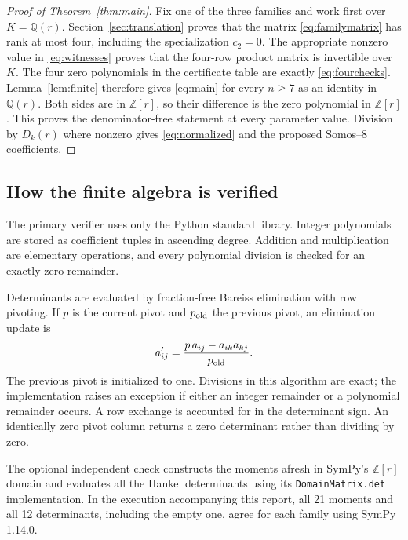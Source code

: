 \documentclass[11pt,letterpaper]{article}
\numberwithin{equation}{section}
\theoremstyle{definition}
\newcommand{\Z}{\mathbb Z}
\newcommand{\Q}{\mathbb Q}
\begin{document}
\begin{proof}[Proof of Theorem~\ref{thm:main}]
Fix one of the three families and work first over \(K=\Q(r)\).
Section~\ref{sec:translation} proves that the matrix \eqref{eq:familymatrix}
has rank at most four, including the specialization \(c_2=0\).
The appropriate nonzero value in \eqref{eq:witnesses} proves that the
four-row product matrix is invertible over \(K\). The four zero
polynomials in the certificate table are exactly
\eqref{eq:fourchecks}. Lemma~\ref{lem:finite} therefore gives
\eqref{eq:main} for every \(n\geq7\) as an identity in \(\Q(r)\).
Both sides are in \(\Z[r]\), so their difference is the zero polynomial
in \(\Z[r]\). This proves the denominator-free statement at every
parameter value. Division by \(D_k(r)\) where nonzero gives
\eqref{eq:normalized} and the proposed Somos--8 coefficients.
\end{proof}

\subsection{How the finite algebra is verified}

The primary verifier uses only the Python standard library. Integer
polynomials are stored as coefficient tuples in ascending degree. Addition
and multiplication are elementary operations, and every polynomial division
is checked for an exactly zero remainder.

Determinants are evaluated by fraction-free Bareiss elimination with row
pivoting. If \(p\) is the current pivot and \(p_{\rm old}\) the previous
pivot, an elimination update is
\begin{equation}
 a'_{ij}=\frac{p\,a_{ij}-a_{ik}a_{kj}}{p_{\rm old}}.
 \label{eq:bareiss}
\end{equation}
The previous pivot is initialized to one. Divisions in this algorithm are
exact; the implementation raises an exception if either an integer
remainder or a polynomial remainder occurs. A row exchange is accounted
for in the determinant sign. An identically zero pivot column returns a
zero determinant rather than dividing by zero.

The optional independent check constructs the moments afresh in SymPy's
\(\Z[r]\) domain and evaluates all the Hankel determinants using its
\texttt{DomainMatrix.det} implementation. In the execution accompanying
this report, all 21 moments and all 12 determinants, including the empty
one, agree for each family using SymPy 1.14.0.
\end{document}
